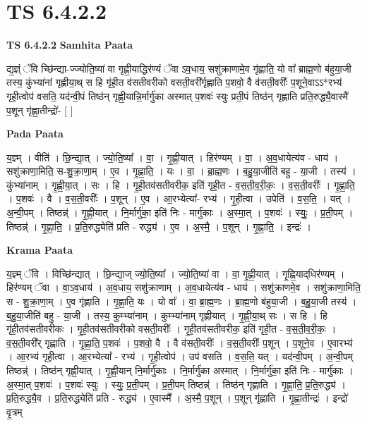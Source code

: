 \documentclass[17pt]{extarticle}
\begin{document}
\section{ TS 6.4.2.2 }

\textbf{TS 6.4.2.2 } \newline
\textbf{Samhita Paata} \newline

द्य॒ज्ञ्ं ॅवि च्छि॑न्द्या-ज्ज्योति॒ष्या॑ वा गृह्णी॒याद्धिर॑ण्यं ॅवा ऽव॒धाय॒ सशु॑क्राणामे॒व गृ॑ह्णाति॒ यो वा᳚ ब्राह्म॒णो ब॑हुया॒जी तस्य॒ कुंभ्या॑नां गृह्णीया॒थ् स हि गृ॑ही॒त व॑सतीवरीको वसती॒वरी᳚र्गृह्णाति प॒शवो॒ वै व॑सती॒वरीः᳚ प॒शूने॒वाऽऽ*रभ्य॑ गृही॒त्वोप॑ वसति॒ यद॑न्वी॒पं तिष्ठ॑न् गृह्णी॒यान्नि॒र्मार्गु॑का अस्मात् प॒शवः॑ स्युः प्रती॒पं तिष्ठ॑न् गृह्णाति प्रति॒रुद्ध्यै॒वास्मै॑ प॒शून् गृ॑ह्णा॒तीन्द्रो॑- [  ] \newline

\textbf{Pada Paata} \newline

य॒ज्ञ्म् । वीति॑ । छि॒न्द्या॒त् । ज्यो॒ति॒ष्या᳚ । वा॒ । गृ॒ह्णी॒यात् । हिर॑ण्यम् । वा॒ । अ॒व॒धायेत्य॑व - धाय॑ । सशु॑क्राणा॒मिति॒ स-शु॒क्रा॒णा॒म् । ए॒व । गृ॒ह्णा॒ति॒ । यः । वा॒ । ब्रा॒ह्म॒णः । ब॒हु॒या॒जीति॑ बहु - या॒जी । तस्य॑ । कुंभ्या॑नाम् । गृ॒ह्णी॒या॒त् । सः । हि । गृ॒ही॒तव॑सतीवरीक॒ इति॑ गृही॒त - व॒स॒ती॒व॒री॒कः॒ । व॒स॒ती॒वरीः᳚ । गृ॒ह्णा॒ति॒ । प॒शवः॑ । वै । व॒स॒ती॒वरीः᳚ । प॒शून् । ए॒व । आ॒रभ्येत्या᳚- रभ्य॑ । गृ॒ही॒त्वा । उपेति॑ । व॒स॒ति॒ । यत् । अ॒न्वी॒पम् । तिष्ठन्न्॑ । गृ॒ह्णी॒यात् । नि॒र्मार्गु॑का॒ इति॑ निः - मार्गु॑काः । अ॒स्मा॒त् । प॒शवः॑ । स्युः॒ । प्र॒ती॒पम् । तिष्ठन्न्॑ । गृ॒ह्णा॒ति॒ । प्र॒ति॒रुद्ध्येति॑ प्रति - रुद्ध्य॑ । ए॒व । अ॒स्मै॒ । प॒शून् । गृ॒ह्णा॒ति॒ । इन्द्रः॑ ।  \newline


\textbf{Krama Paata} \newline

य॒ज्ञ्म् ॅवि । विच्छि॑न्द्यात् । छि॒न्द्या॒ज् ज्यो॒ति॒ष्या᳚ । ज्यो॒ति॒ष्या॑ वा । वा॒ गृ॒ह्णी॒यात् । गृ॒ह्णि॒याद्‌धिर॑ण्यम् । हिर॑ण्यम् ॅवा । वा॒ऽव॒धाय॑ । अ॒व॒धाय॒ सशु॑क्राणाम् । अ॒व॒धायेत्य॑व - धाय॑ । सशु॑क्राणमे॒व । सशु॑क्राणा॒मिति॒ स - शु॒क्रा॒णा॒म् । ए॒व गृ॑ह्णाति । गृ॒ह्णा॒ति॒ यः । यो वा᳚ । वा॒ ब्रा॒ह्म॒णः । ब्रा॒ह्म॒णो ब॑हुया॒जी । ब॒हु॒या॒जी तस्य॑ । ब॒हु॒या॒जीति॑ बहु - या॒जी । तस्य॒ कुम्भ्या॑नाम् । कुम्भ्या॑नाम् गृह्णीयात् । गृ॒ह्णी॒या॒थ् सः । स हि । हि गृ॑ही॒तव॑सतीवरीकः । गृ॒ही॒तव॑सतीवरीको वसती॒वरीः᳚ । गृ॒ही॒तव॑सतीवरीक॒ इति॑ गृही॒त - व॒स॒ती॒व॒री॒कः॒ । व॒स॒ती॒वरी᳚र् गृह्णाति । गृ॒ह्णा॒ति॒ प॒शवः॑ । प॒शवो॒ वै । वै व॑सती॒वरीः᳚ । व॒स॒ती॒वरीः᳚ प॒शून् । प॒शूने॒व । ए॒वारभ्य॑ । आ॒रभ्य॑ गृही॒त्वा । आ॒रभ्येत्या᳚ - रभ्य॑ । गृ॒ही॒त्वोप॑ । उप॑ वसति । व॒स॒ति॒ यत् । यद॑न्वी॒पम् । अ॒न्वी॒पम् तिष्ठन्न्॑ । तिष्ठ॑न् गृह्णी॒यात् । गृ॒ह्णी॒यान् नि॒र्मार्गु॑काः । नि॒र्मार्गु॑का अस्मात् । नि॒र्मार्गु॑का॒ इति॑ निः - मार्गु॑काः । अ॒स्मा॒त् प॒शवः॑ । प॒शवः॑ स्युः । स्युः॒ प्र॒ती॒पम् । प्र॒ती॒पम् तिष्ठन्न्॑ । तिष्ठ॑न् गृह्णाति । गृ॒ह्णा॒ति॒ प्र॒ति॒रुद्ध्य॑ । प्र॒ति॒रुद्ध्यै॒व । प्र॒ति॒रुद्ध्येति॑ प्रति - रुद्ध्य॑ । ए॒वास्मै᳚ । अ॒स्मै॒ प॒शून् । प॒शून् गृ॑ह्णाति । गृ॒ह्णा॒तीन्द्रः॑ । इन्द्रो॑ वृ॒त्रम् \newline
\end{document}
